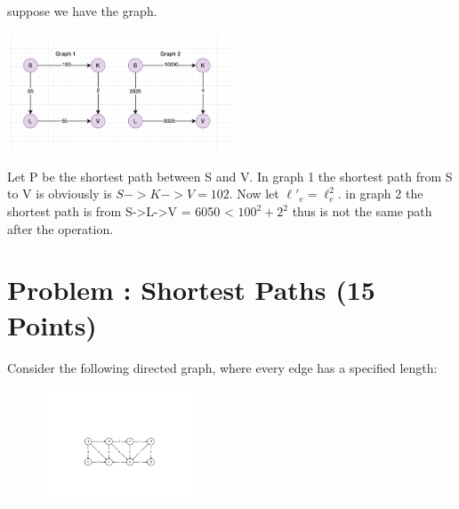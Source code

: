 \documentclass[12pt]{amsart}
\newcounter{pNum}
\newcommand{\problem}[2]{\addtocounter{pNum}{1}
\section*{Problem \arabic{pNum}: #1 (#2 Points)}}
\begin{document}
\begin{enumerate}[(a)]
suppose we have the graph.
 \begin{center}
\includegraphics[width=0.5\textwidth]{QQ4.png}
\end{center}
Let P be the shortest path between S and V.
In graph 1 the shortest path from S to V is obviously is $S->K->V = 102$. Now let $\ell'_e = \ell_e^2$.  in graph 2 the shortest path is from S->L->V = 6050 < $100^2 + 2^2$ thus is not the same path after the operation. 



\newpage


\end{enumerate}

\newpage


\problem{Shortest Paths}{15}
Consider the following directed graph, where every edge has a specified length:
\begin{figure}[H]
  \centering
    \includegraphics[width=0.4\textwidth]{FIGS/figDijkstra.pdf}
\end{figure}
\end{document}
